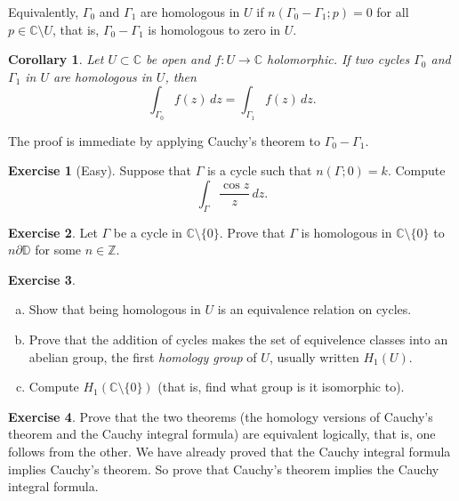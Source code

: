 \documentclass[12pt,openany]{book}
\newcommand{\C}{{\mathbb{C}}}
\newcommand{\Z}{{\mathbb{Z}}}
\newcommand{\D}{{\mathbb{D}}}
\newcommand{\myindex}[1]{#1\index{#1}}
\theoremstyle{plain}
\newtheorem{cor}[thm]{Corollary}
\theoremstyle{remark}
\theoremstyle{definition}
\newenvironment{exbox}{%
    \def\FrameCommand{\vrule width 1pt \relax\hspace{10pt}}%
    \MakeFramed{\advance\hsize-\width\FrameRestore}%
}{%
    \endMakeFramed
}
\newenvironment{exparts}{%
    \leavevmode\begin{enumerate}[a),noitemsep,topsep=0pt,parsep=0pt,partopsep=0pt]
}{%
    \end{enumerate}
}
\theoremstyle{exercise}
\newtheorem{exercise}{Exercise}[section]
\theoremstyle{example}
\begin{document}
Equivalently, $\Gamma_0$ and $\Gamma_1$ are homologous in $U$ if
$n(\Gamma_0 - \Gamma_1;p) = 0$ for all $p \in \C \setminus U$,
that is, $\Gamma_0-\Gamma_1$ is homologous to zero in $U$.

\begin{cor} \label{cor:homologoussameint}
Let $U \subset \C$ be open and $f \colon U \to \C$ holomorphic.
If two cycles
$\Gamma_0$ and $\Gamma_1$ in $U$
are homologous in $U$, then
\begin{equation*}
\int_{\Gamma_0} f(z)\, dz = 
\int_{\Gamma_1} f(z)\, dz .
\end{equation*}
\end{cor}

The proof is immediate by applying Cauchy's theorem to $\Gamma_0-\Gamma_1$.

\begin{exbox}
\begin{exercise}[Easy]
Suppose that $\Gamma$ is a cycle such that
$n(\Gamma;0) = k$.  Compute
\begin{equation*}
\int_{\Gamma} \frac{\cos z}{z} \, dz .
\end{equation*}
\end{exercise}

\begin{exercise}
Let $\Gamma$ be
a cycle in $\C \setminus \{ 0 \}$.
Prove that $\Gamma$ is homologous in $\C \setminus \{ 0 \}$
to $n \partial \D$ for some $n \in \Z$.
\end{exercise}

\begin{exercise} \label{exercise:H1U}
\begin{exparts}
\item
Show that being homologous in $U$ is an equivalence relation on cycles.
\item
Prove that the addition of cycles makes the set of equivelence classes
into an abelian group, the
first \emph{\myindex{homology group}} of $U$,
usually written $H_1(U)$.
\item
Compute $H_1(\C \setminus \{ 0 \})$ (that is,
find what group is it isomorphic to).
\end{exparts}
\end{exercise}

\begin{exercise}
Prove that the two theorems
(the homology versions of Cauchy's theorem and the Cauchy integral formula)
are equivalent logically, that is, one follows
from the other.  We have already proved that the Cauchy integral formula
implies Cauchy's theorem.  So prove that
Cauchy's theorem implies the Cauchy integral formula.
\end{exercise}


\end{exbox}
\end{document}
